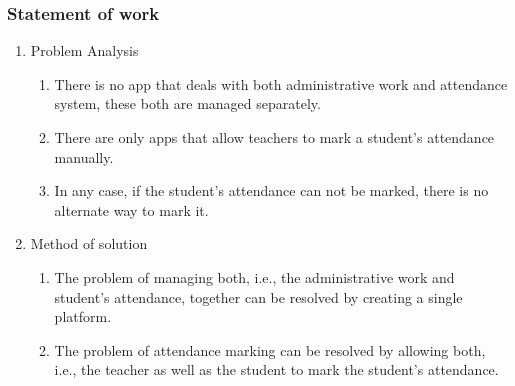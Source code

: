 \subsubsection{Statement of work}
        \begin{enumerate}
            \item Problem Analysis
            \begin{enumerate}
                \item There is no app that deals with both administrative work and attendance system, these both are managed separately.
                \item There are only apps that allow teachers to mark a student's attendance manually.
                \item In any case, if the student's attendance can not be marked, there is no alternate way to mark it.
            \end{enumerate}
            \item Method of solution
            \begin{enumerate}
                \item The problem of managing both, i.e., the administrative work and student's attendance, together can be resolved by creating a single platform.
                \item The problem of attendance marking can be resolved by allowing both, i.e., the teacher as well as the student to mark the student's attendance.
            \end{enumerate}
        \end{enumerate}